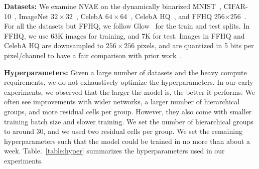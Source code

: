 \documentclass{article}
\begin{document}
\textbf{Datasets:} We examine NVAE on the dynamically binarized MNIST~\cite{lecun1998mnist}, CIFAR-10~\cite{krizhevsky2009cifar}, ImageNet $32\times32$~\cite{deng2009imagenet}, CelebA $64\times64$~\cite{liu2015celeba, larsen2016autoencoding}, CelebA HQ~\cite{karras2018progressive}, and FFHQ 256$\times$256~\cite{karras2019style}. For all the datasets but FFHQ, we follow Glow~\cite{kingma2018glow} for the train and test splits. In FFHQ, we use 63K images for training, and 7K for test. Images in FFHQ and CelebA HQ are downsampled to $256\times256$ pixels, and are quantized in 5 bits per pixel/channel to have a fair comparison with prior work~\cite{kingma2018glow}.

\textbf{Hyperparameters:} Given a large number of datasets and the heavy compute requirements, we do not exhaustively optimize the hyperparameters. In our early experiments, we observed that the larger the model is, the better it performs. We often see improvements with wider networks, a larger number of hierarchical groups, and more residual cells per group. However, they also come with smaller training batch size and slower training. We set the number of hierarchical groups to around 30, and we used two residual cells per group. We set the remaining hyperparameters such that the model could be trained in no more than about a week. Table.~\ref{table:hyper} summarizes the hyperparameters used in our experiments.
\end{document}
